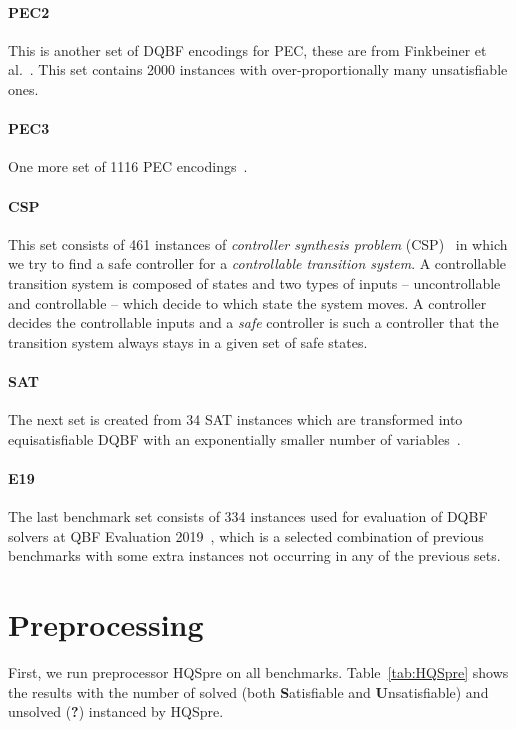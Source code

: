 \documentclass[
  digital, %
  color,
  twoside, %
  table,   %
  nolof,     %
  nolot,     %
]{fithesis3}
\theoremstyle{definition}
\theoremstyle{remark}
\begin{document}
\paragraph{PEC2}
This is another set of DQBF encodings for PEC, these are from Finkbeiner et al.~\cite{FastDQBFRefutation}. This set contains 2000 instances with over-proportionally many unsatisfiable ones.

\paragraph{PEC3}
One more set of 1116 PEC encodings~\cite{HQSsimpleAlg,PECScholl}.

\paragraph{CSP}
This set consists of 461 instances of \emph{controller synthesis problem} (CSP)~\cite{CSPbenchmarks} in which we try to find a safe controller for a \emph{controllable transition system}. A controllable transition system is composed of states and two types of inputs -- uncontrollable and controllable -- which decide to which state the system moves. A controller decides the controllable inputs and a \emph{safe} controller is such a controller that the transition system always stays in a given set of safe states.

\paragraph{SAT}
The next set is created from 34 SAT instances which are transformed into equisatisfiable DQBF with an exponentially smaller number of variables~\cite{SATbenchmarks}.

\paragraph{E19}
The last benchmark set consists of 334 instances used for evaluation of DQBF solvers at QBF Evaluation 2019~\cite{QBFeval19}, which is a selected combination of previous benchmarks with some extra instances not occurring in any of the previous sets.


\section{Preprocessing}
First, we run preprocessor HQSpre on all benchmarks. Table~\ref{tab:HQSpre} shows the results with the number of solved (both \textbf{S}atisfiable and \textbf{U}n\-sa\-ti\-sfi\-able) and unsolved (\textbf{?}) instanced by HQSpre.
\end{document}
